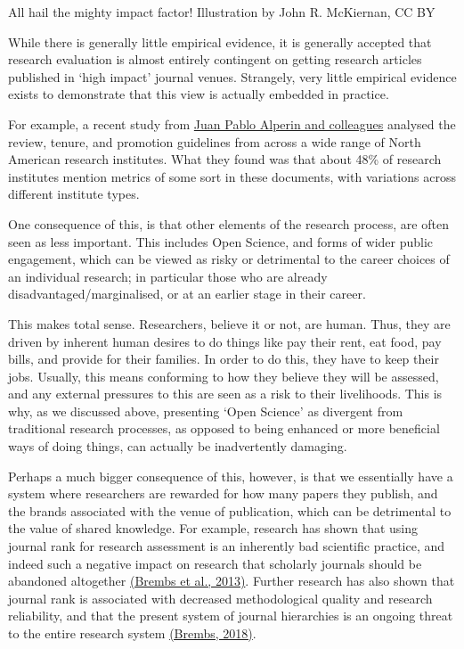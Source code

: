 \documentclass[]{book}
\begin{document}
{{{{All hail the mighty impact factor! Illustration by John R. McKiernan, CC BY

While there is generally little empirical evidence, it is generally accepted that research evaluation is almost entirely contingent on getting research articles published in `high impact' journal venues. Strangely, very little empirical evidence exists to demonstrate that this view is actually embedded in practice.

For example, a recent study from \href{https://hcommons.org/deposits/item/hc:21015/}{Juan Pablo Alperin and colleagues} analysed the review, tenure, and promotion guidelines from across a wide range of North American research institutes. What they found was that about 48\% of research institutes mention metrics of some sort in these documents, with variations across different institute types.

One consequence of this, is that other elements of the research process, are often seen as less important. This includes Open Science, and forms of wider public engagement, which can be viewed as risky or detrimental to the career choices of an individual research; in particular those who are already disadvantaged/marginalised, or at an earlier stage in their career.

This makes total sense. Researchers, believe it or not, are human. Thus, they are driven by inherent human desires to do things like pay their rent, eat food, pay bills, and provide for their families. In order to do this, they have to keep their jobs. Usually, this means conforming to how they believe they will be assessed, and any external pressures to this are seen as a risk to their livelihoods. This is why, as we discussed above, presenting `Open Science' as divergent from traditional research processes, as opposed to being enhanced or more beneficial ways of doing things, can actually be inadvertently damaging.

Perhaps a much bigger consequence of this, however, is that we essentially have a system where researchers are rewarded for how many papers they publish, and the brands associated with the venue of publication, which can be detrimental to the value of shared knowledge. For example, research has shown that using journal rank for research assessment is an inherently bad scientific practice, and indeed such a negative impact on research that scholarly journals should be abandoned altogether \href{https://www.frontiersin.org/articles/10.3389/fnhum.2013.00291/full}{(Brembs et al., 2013)}. Further research has also shown that journal rank is associated with decreased methodological quality and research reliability, and that the present system of journal hierarchies is an ongoing threat to the entire research system \href{https://www.frontiersin.org/articles/10.3389/fnhum.2018.00037/full}{(Brembs, 2018)}.

}}}}
\end{document}
